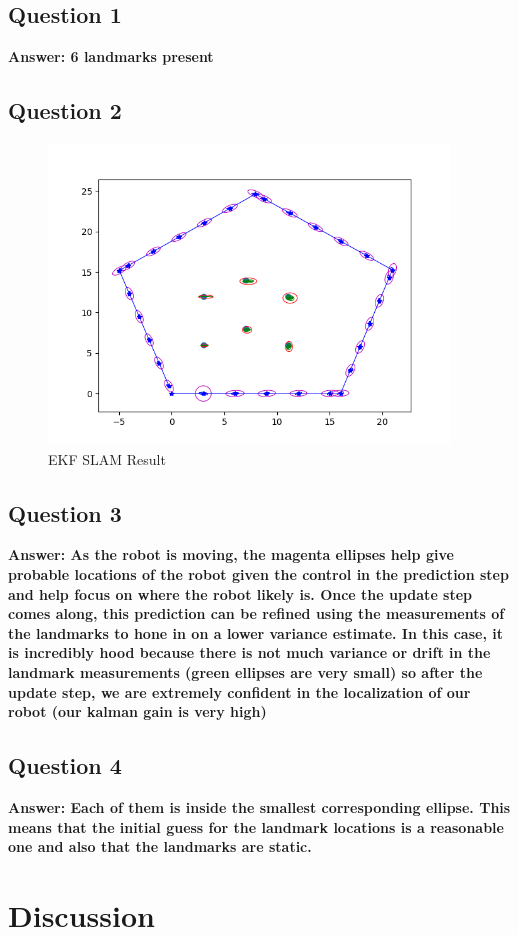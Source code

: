 \documentclass[12pt, a4paper]{article}
\begin{document}
\subsection*{Question 1}
\textbf{Answer: 6 landmarks present}
\subsection*{Question 2}
\begin{figure}[!htb]
    \includegraphics[width=0.95\textwidth]{EKF_SLAM_Result.png}
    \caption{EKF SLAM Result}
\end{figure}
\clearpage
\subsection*{Question 3}
\textbf{Answer: As the robot is moving, the magenta ellipses help give probable locations of the robot given the control in the prediction step and help focus on where the robot likely is. Once the update step comes along, this prediction can be refined using the measurements of the landmarks to hone in on a lower variance estimate. In this case, it is incredibly hood because there is not much variance or drift in the landmark measurements (green ellipses are very small) so after the update step, we are extremely confident in the localization of our robot (our kalman gain is very high)}
\subsection*{Question 4}
\textbf{Answer: Each of them is inside the smallest corresponding ellipse. This means that the initial guess for the landmark locations is a reasonable one and also that the landmarks are static.}

\clearpage
\section{Discussion}
\end{document}
